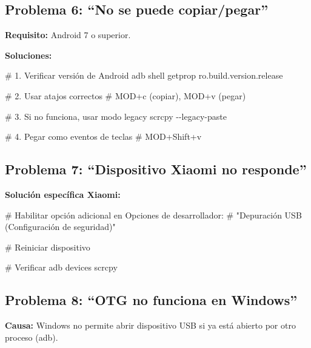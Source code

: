 \documentclass[
  doc,
  floatsintext,
  longtable,
  a4paper,
  nolmodern,
  notxfonts,
  notimes,
  12pt,
  colorlinks=true,linkcolor=blue,citecolor=blue,urlcolor=blue]{apa7}
\newenvironment{Shaded}{\begin{snugshade}}{\end{snugshade}}
\newcommand{\AttributeTok}[1]{\textcolor[rgb]{0.40,0.45,0.13}{#1}}
\newcommand{\CommentTok}[1]{\textcolor[rgb]{0.37,0.37,0.37}{#1}}
\newcommand{\ExtensionTok}[1]{\textcolor[rgb]{0.00,0.23,0.31}{#1}}
\newcommand{\NormalTok}[1]{\textcolor[rgb]{0.00,0.23,0.31}{#1}}
\begin{document}
\subsection{Problema 6: ``No se puede
copiar/pegar''}\label{problema-6-no-se-puede-copiarpegar}

\textbf{Requisito:} Android 7 o superior.

\textbf{Soluciones:}

\begin{Shaded}
\begin{Highlighting}[]
\CommentTok{\# 1. Verificar versión de Android}
\ExtensionTok{adb}\NormalTok{ shell getprop ro.build.version.release}

\CommentTok{\# 2. Usar atajos correctos}
\CommentTok{\# MOD+c (copiar), MOD+v (pegar)}

\CommentTok{\# 3. Si no funciona, usar modo legacy}
\ExtensionTok{scrcpy} \AttributeTok{{-}{-}legacy{-}paste}

\CommentTok{\# 4. Pegar como eventos de teclas}
\CommentTok{\# MOD+Shift+v}
\end{Highlighting}
\end{Shaded}

\subsection{Problema 7: ``Dispositivo Xiaomi no
responde''}\label{problema-7-dispositivo-xiaomi-no-responde}

\textbf{Solución específica Xiaomi:}

\begin{Shaded}
\begin{Highlighting}[]
\CommentTok{\# Habilitar opción adicional en Opciones de desarrollador:}
\CommentTok{\# "Depuración USB (Configuración de seguridad)"}

\CommentTok{\# Reiniciar dispositivo}

\CommentTok{\# Verificar}
\ExtensionTok{adb}\NormalTok{ devices}
\ExtensionTok{scrcpy}
\end{Highlighting}
\end{Shaded}

\subsection{Problema 8: ``OTG no funciona en
Windows''}\label{problema-8-otg-no-funciona-en-windows}

\textbf{Causa:} Windows no permite abrir dispositivo USB si ya está
abierto por otro proceso (adb).
\end{document}
